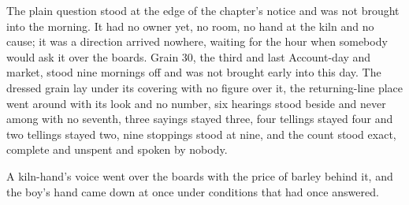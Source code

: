 The plain question stood at the edge of the chapter's notice and was not brought into the morning. It had no owner yet, no room, no hand at the kiln and no cause; it was a direction arrived nowhere, waiting for the hour when somebody would ask it over the boards. Grain 30, the third and last Account-day and market, stood nine mornings off and was not brought early into this day. The dressed grain lay under its covering with no figure over it, the returning-line place went around with its look and no number, six hearings stood beside and never among with no seventh, three sayings stayed three, four tellings stayed four and two tellings stayed two, nine stoppings stood at nine, and the count stood exact, complete and unspent and spoken by nobody.

A kiln-hand's voice went over the boards with the price of barley behind it, and the boy's hand came down at once under conditions that had once answered.
